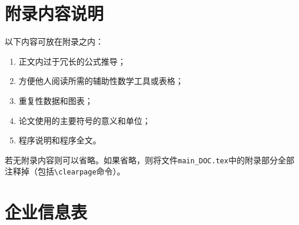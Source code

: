 
\begin{appendices}

\section{附录内容说明}

以下内容可放在附录之内：
\begin{enumerate}[label=(\arabic*)]
  \item{正文内过于冗长的公式推导；}
  \item{方便他人阅读所需的辅助性数学工具或表格；}
  \item{重复性数据和图表；}
  \item{论文使用的主要符号的意义和单位；}
  \item{程序说明和程序全文。}
\end{enumerate}

若无附录内容则可以省略。如果省略，则将文件\verb|main_DOC.tex|中的附录部分全部注释掉（包括\verb|\clearpage|命令）。


\section{企业信息表}


\end{appendices}
